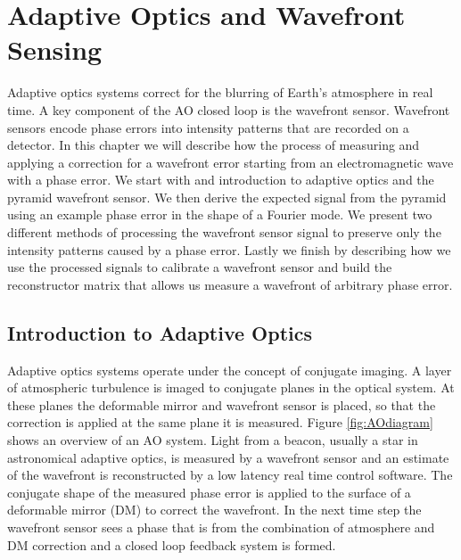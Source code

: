\chapter{Adaptive Optics and Wavefront Sensing}

Adaptive optics systems correct for the blurring of Earth's atmosphere in real time. A key component of the AO closed loop is the wavefront sensor. Wavefront sensors encode phase errors into intensity patterns that are recorded on a detector. In this chapter we will describe how the process of measuring and applying a correction for a wavefront error starting from an electromagnetic wave with a phase error. We start with and introduction to adaptive optics and the pyramid wavefront sensor. We then derive the expected signal from the pyramid using an example phase error in the shape of a Fourier mode. We present two different methods of processing the wavefront sensor signal to preserve only the intensity patterns caused by a phase error. Lastly we finish by describing how we use the processed signals to calibrate a wavefront sensor and build the reconstructor matrix that allows us measure a wavefront of arbitrary phase error. 


 \section{Introduction to Adaptive Optics}
 
Adaptive optics systems operate under the concept of conjugate imaging. A layer of atmospheric turbulence is imaged to conjugate planes in the optical system. At these planes the deformable mirror and wavefront sensor is placed, so that the correction is applied at the same plane it is measured. Figure \ref{fig:AOdiagram} shows an overview of an AO system. Light from a beacon, usually a star in astronomical adaptive optics, is measured by a wavefront sensor and an estimate of the wavefront is reconstructed by a low latency real time control software. The conjugate shape of the measured phase error is applied to the surface of a deformable mirror (DM) to correct the wavefront. In the next time step the wavefront sensor sees a phase that is from the combination of atmosphere and DM correction and a closed loop feedback system is formed. 



